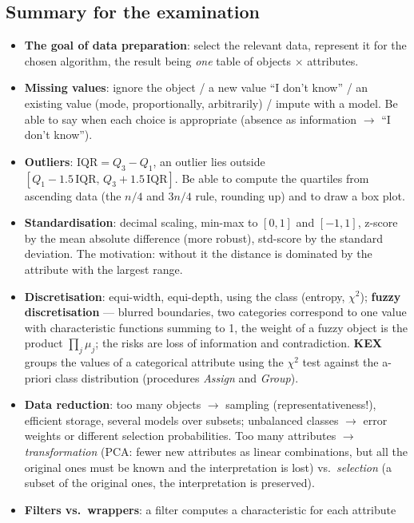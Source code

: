 \documentclass[11pt,a4paper]{article}
\theoremstyle{definition}
\providecommand{\uv}[1]{``#1''}
\begin{document}
\subsection{Summary for the examination}

\begin{itemize}
\item \textbf{The goal of data preparation}: select the relevant data, represent it for the
      chosen algorithm, the result being \emph{one} table of objects $\times$ attributes.
\item \textbf{Missing values}: ignore the object / a new value \uv{I don't know} / an existing
      value (mode, proportionally, arbitrarily) / impute with a model. Be able to say when each
      choice is appropriate (absence as information $\to$ \uv{I don't know}).
\item \textbf{Outliers}: $\mathrm{IQR}=Q_3-Q_1$, an outlier lies outside
      $[Q_1-1.5\,\mathrm{IQR},\,Q_3+1.5\,\mathrm{IQR}]$. Be able to compute the quartiles from
      ascending data (the $n/4$ and $3n/4$ rule, rounding up) and to draw a box plot.
\item \textbf{Standardisation}: decimal scaling, min-max to $[0,1]$ and $[-1,1]$, z-score by the
      mean absolute difference (more robust), std-score by the standard deviation. The
      motivation: without it the distance is dominated by the attribute with the largest range.
\item \textbf{Discretisation}: equi-width, equi-depth, using the class (entropy, $\chi^2$);
      \textbf{fuzzy discretisation} --- blurred boundaries, two categories correspond to one
      value with characteristic functions summing to 1, the weight of a fuzzy object is the
      product $\prod_j\mu_j$; the risks are loss of information and contradiction. \textbf{KEX}
      groups the values of a categorical attribute using the $\chi^2$ test against the a-priori
      class distribution (procedures \emph{Assign} and \emph{Group}).
\item \textbf{Data reduction}: too many objects $\to$ sampling (representativeness!), efficient
      storage, several models over subsets; unbalanced classes $\to$ error weights or different
      selection probabilities. Too many attributes $\to$ \emph{transformation} (PCA: fewer new
      attributes as linear combinations, but all the original ones must be known and the
      interpretation is lost) vs.\ \emph{selection} (a subset of the original ones, the
      interpretation is preserved).
\item \textbf{Filters vs.\ wrappers}: a filter computes a characteristic for each attribute

\end{itemize}
\end{document}

